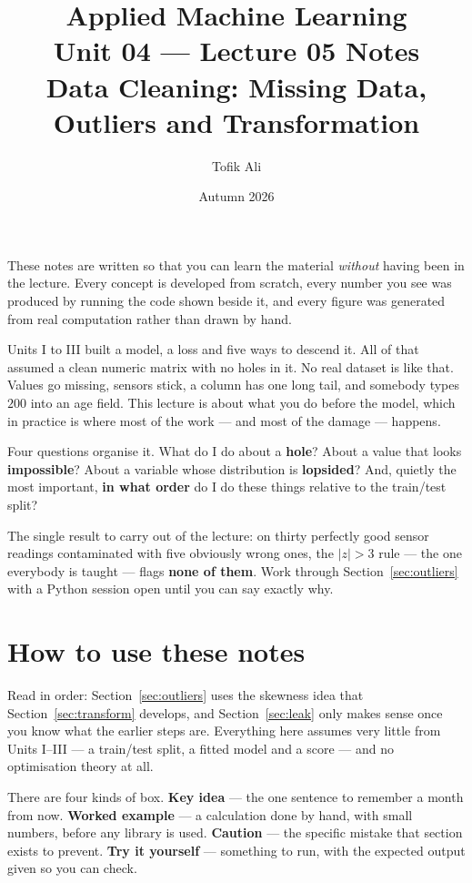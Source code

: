 \documentclass[11pt]{article}
\title{Applied Machine Learning\\Unit 04 --- Lecture 05 Notes\\
       Data Cleaning: Missing Data, Outliers and Transformation}
\author{Tofik Ali}
\date{Autumn 2026}
\begin{document}
\maketitle

\begin{keyidea}
These notes are written so that you can learn the material \emph{without}
having been in the lecture. Every concept is developed from scratch, every
number you see was produced by running the code shown beside it, and every
figure was generated from real computation rather than drawn by hand.

Units I to III built a model, a loss and five ways to descend it. All of that
assumed a clean numeric matrix with no holes in it. No real dataset is like
that. Values go missing, sensors stick, a column has one long tail, and
somebody types $200$ into an age field. This lecture is about what you do
before the model, which in practice is where most of the work --- and most of
the damage --- happens.

Four questions organise it. What do I do about a \textbf{hole}? About a value
that looks \textbf{impossible}? About a variable whose distribution is
\textbf{lopsided}? And, quietly the most important, \textbf{in what order} do
I do these things relative to the train/test split?

The single result to carry out of the lecture: on thirty perfectly good sensor
readings contaminated with five obviously wrong ones, the $|z| > 3$ rule ---
the one everybody is taught --- flags \textbf{none of them}. Work through
Section~\ref{sec:outliers} with a Python session open until you can say
exactly why.
\end{keyidea}

\tableofcontents
\newpage

\section{How to use these notes}
\label{sec:how}

Read in order: Section~\ref{sec:outliers} uses the skewness idea that
Section~\ref{sec:transform} develops, and Section~\ref{sec:leak} only makes
sense once you know what the earlier steps are. Everything here assumes very
little from Units I--III --- a train/test split, a fitted model and a score ---
and no optimisation theory at all.

There are four kinds of box. \textbf{Key idea} --- the one sentence to
remember a month from now. \textbf{Worked example} --- a calculation done by
hand, with small numbers, before any library is used. \textbf{Caution} --- the
specific mistake that section exists to prevent. \textbf{Try it yourself} ---
something to run, with the expected output given so you can check.
\end{document}
